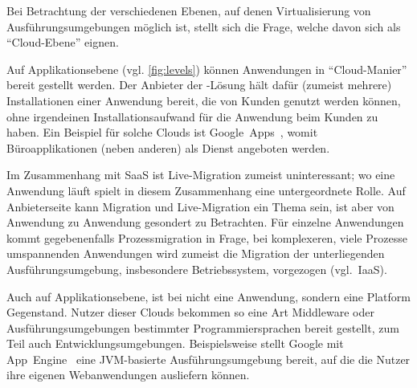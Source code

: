Bei Betrachtung der verschiedenen Ebenen, auf denen Virtualisierung
von Ausführungsumgebungen möglich ist, stellt sich die Frage, welche
davon sich als "`Cloud-Ebene"' eignen.~\cite{Gebhart2010:Virtualization-}
\begin{description}
\item[SaaS] Auf Applikationsebene (vgl. \autoref{fig:levels}) können
  Anwendungen in "`Cloud-Manier"' bereit gestellt werden. Der Anbieter
  der -Lösung hält dafür (zumeist mehrere) Installationen
  einer Anwendung bereit, die von Kunden genutzt werden können, ohne
  irgendeinen Installationsaufwand für die Anwendung beim Kunden zu
  haben. Ein Beispiel für solche Clouds ist
  Google~Apps~\cite{Google-Apps}, womit \zB Büroapplikationen (neben
  anderen) als Dienst angeboten werden.

  Im Zusammenhang mit \ac{SaaS} ist Live-Migration zumeist
  uninteressant; wo eine Anwendung läuft spielt in diesem Zusammenhang
  eine untergeordnete Rolle. Auf Anbieterseite kann Migration und
  Live-Migration ein Thema sein, ist aber von Anwendung zu Anwendung
  gesondert zu Betrachten. Für einzelne Anwendungen kommt
  gegebenenfalls Prozessmigration in Frage, bei komplexeren, viele
  Prozesse umspannenden Anwendungen wird zumeist die Migration der
  unterliegenden Ausführungsumgebung, insbesondere Betriebssystem,
  vorgezogen (vgl.~IaaS).
\item[PaaS] Auch auf Applikationsebene, ist bei  nicht eine
  Anwendung, sondern eine Platform Gegenstand. Nutzer dieser Clouds
  bekommen so eine Art Middleware oder Ausführungsumgebungen
  bestimmter Programmiersprachen bereit gestellt, zum Teil auch
  Entwicklungsumgebungen. Beispielsweise stellt Google mit
  App~Engine~\cite{Google-App-Engi} eine JVM-basierte
  Ausführungsumgebung bereit, auf die die Nutzer ihre eigenen
  Webanwendungen ausliefern können.
  

\end{description}
